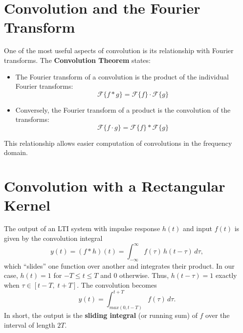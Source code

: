 \documentclass[12pt,a4paper]{report}
\begin{document}
\section*{Convolution and the Fourier Transform}

One of the most useful aspects of convolution is its relationship with Fourier transforms. The \textbf{Convolution Theorem} states:

\begin{itemize}
    \item The Fourier transform of a convolution is the product of the individual Fourier transforms:
    \[
    \mathcal{F}\{f * g\} = \mathcal{F}\{f\} \cdot \mathcal{F}\{g\}
    \]
    
    \item Conversely, the Fourier transform of a product is the convolution of the transforms:
    \[
    \mathcal{F}\{f \cdot g\} = \mathcal{F}\{f\} * \mathcal{F}\{g\}
    \]
\end{itemize}

This relationship allows easier computation of convolutions in the frequency domain.
\section*{Convolution with a Rectangular Kernel}

The output of an LTI system with impulse response $h(t)$ and input $f(t)$ is given by the convolution integral
\[
y(t) = (f*h)(t) = \int_{-\infty}^{\infty} f(\tau)\, h(t-\tau)\, d\tau,
\]
which ``slides'' one function over another and integrates their product. In our case, $h(t) = 1$ for $-T \leq t \leq T$ and $0$ otherwise. Thus, $h(t-\tau) = 1$ exactly when $\tau \in [t-T,\;t+T]$. The convolution becomes
\[
y(t) = \int_{max(0,t-T)}^{t+T} f(\tau)\, d\tau.
\]
In short, the output is the \textbf{sliding integral} (or running sum) of $f$ over the interval of length $2T$.
\end{document}
